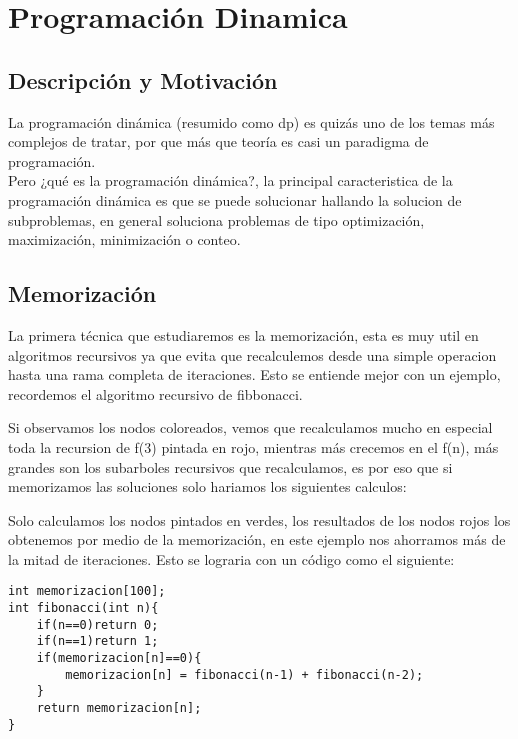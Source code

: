 \chapter{Programación Dinamica}
\section{Descripción y Motivación}

La programación dinámica (resumido como dp) es quizás uno de los temas más complejos de tratar, por que más que teoría es casi un paradigma de programación.
\\Pero ¿qué es la programación dinámica?, la principal caracteristica de la programación dinámica es que se puede solucionar hallando la solucion de subproblemas, en general soluciona problemas de tipo optimización, maximización, minimización o conteo.


\section{Memorización}
La primera técnica que estudiaremos es la memorización, esta es muy util en algoritmos recursivos ya que evita que recalculemos desde una simple operacion hasta una rama completa de iteraciones. Esto se entiende mejor con un ejemplo, recordemos el algoritmo recursivo de fibbonacci.


Si observamos los nodos coloreados, vemos que recalculamos mucho en especial toda la recursion de f(3) pintada en rojo, mientras más crecemos en el f(n), más grandes son los subarboles recursivos que recalculamos, es por eso que si memorizamos las soluciones solo hariamos los siguientes calculos:


Solo calculamos los nodos pintados en verdes, los resultados de los nodos rojos los obtenemos por medio de la memorización, en este ejemplo nos ahorramos más de la mitad de iteraciones. Esto se lograria con un código como el siguiente:

\begin{minipage}{\textwidth}
\begin{lstlisting}[style=C,caption=fibonacciMemorizacion.cpp]
int memorizacion[100];
int fibonacci(int n){
    if(n==0)return 0;
    if(n==1)return 1;
    if(memorizacion[n]==0){
        memorizacion[n] = fibonacci(n-1) + fibonacci(n-2);
    }
    return memorizacion[n];
}
\end{lstlisting}
\end{minipage}

